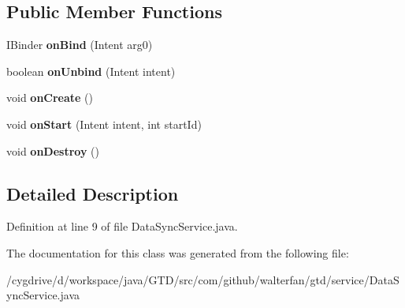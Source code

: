 \subsection*{Public Member Functions}
\begin{DoxyCompactItemize}
\item 
\hypertarget{classcom_1_1github_1_1walterfan_1_1gtd_1_1service_1_1DataSyncService_a8a5f6bde4dde48a134c4999cc013c5bb}{I\-Binder {\bfseries on\-Bind} (Intent arg0)}\label{classcom_1_1github_1_1walterfan_1_1gtd_1_1service_1_1DataSyncService_a8a5f6bde4dde48a134c4999cc013c5bb}

\item 
\hypertarget{classcom_1_1github_1_1walterfan_1_1gtd_1_1service_1_1DataSyncService_a66f5926a213663cd6163e12bbab8d5ed}{boolean {\bfseries on\-Unbind} (Intent intent)}\label{classcom_1_1github_1_1walterfan_1_1gtd_1_1service_1_1DataSyncService_a66f5926a213663cd6163e12bbab8d5ed}

\item 
\hypertarget{classcom_1_1github_1_1walterfan_1_1gtd_1_1service_1_1DataSyncService_a897e80cde7e29e8aaf93a8da8322672e}{void {\bfseries on\-Create} ()}\label{classcom_1_1github_1_1walterfan_1_1gtd_1_1service_1_1DataSyncService_a897e80cde7e29e8aaf93a8da8322672e}

\item 
\hypertarget{classcom_1_1github_1_1walterfan_1_1gtd_1_1service_1_1DataSyncService_ac3af94077f6301e227828eaddabd7f80}{void {\bfseries on\-Start} (Intent intent, int start\-Id)}\label{classcom_1_1github_1_1walterfan_1_1gtd_1_1service_1_1DataSyncService_ac3af94077f6301e227828eaddabd7f80}

\item 
\hypertarget{classcom_1_1github_1_1walterfan_1_1gtd_1_1service_1_1DataSyncService_a6200c5384d706dc582e69547037b2b7c}{void {\bfseries on\-Destroy} ()}\label{classcom_1_1github_1_1walterfan_1_1gtd_1_1service_1_1DataSyncService_a6200c5384d706dc582e69547037b2b7c}

\end{DoxyCompactItemize}


\subsection{Detailed Description}


Definition at line 9 of file Data\-Sync\-Service.\-java.



The documentation for this class was generated from the following file\-:\begin{DoxyCompactItemize}
\item 
/cygdrive/d/workspace/java/\-G\-T\-D/src/com/github/walterfan/gtd/service/Data\-Sync\-Service.\-java\end{DoxyCompactItemize}
